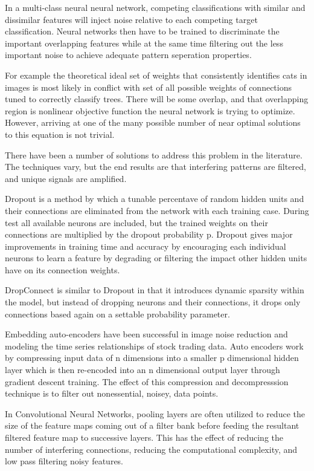 \documentclass{llncs}
\begin{document}
In a multi-class neural neural network, competing classifications with similar and dissimilar features will inject noise relative to each competing target classification. Neural networks then have to be trained to discriminate the important overlapping features while at the same time filtering out the less important noise to achieve adequate pattern seperation properties.

For example the theoretical ideal set of weights that consistently identifies cats in images is most likely in conflict with set of all possible weights of connections tuned to correctly classify trees.  There will be some overlap, and that overlapping region is nonlinear objective function the neural network is trying to optimize.  However, arriving at one of the many possible number of near optimal solutions to this equation is not trivial.

There have been a number of solutions to address this problem in the literature.  The techniques vary, but the end results are that interfering patterns are filtered, and unique signals are amplified.

Dropout is a method by which a tunable percentave of random hidden units and their connections are eliminated from the network with each training case.  During test all available neurons are included, but the trained weights on their connections are multiplied by the dropout probability p.  Dropout gives major improvements in training time and accuracy by encouraging each individual neurons to learn a feature by degrading or filtering the impact other hidden units have on its connection weights.

DropConnect is similar to Dropout in that it introduces dynamic sparsity within the model, but instead of dropping neurons and their connections, it drops only connections based again on a settable probability parameter.

Embedding auto-encoders have been successful in image noise reduction and modeling the time series relationships of stock trading data.  Auto encoders work by compressing input data of n dimensions into a smaller p dimensional hidden layer which is then re-encoded into an n dimensional output layer through gradient descent training.  The effect of this compression and decompresssion technique is to filter out nonessential, noisey, data points.

In Convolutional Neural Networks,  pooling layers are often utilized to reduce the size of the feature maps coming out of a filter bank before feeding the resultant filtered feature map to successive layers.  This has the effect of reducing the number of interfering connections, reducing the computational complexity, and low pass filtering noisy features.
\end{document}

